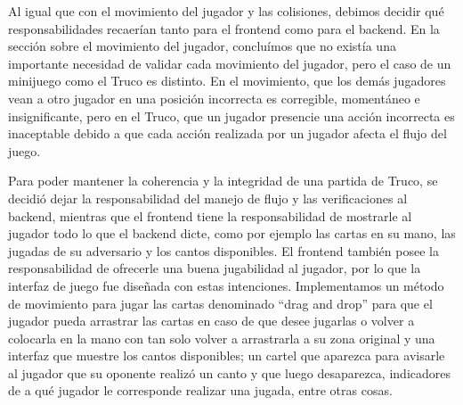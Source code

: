 Al igual que con el movimiento del jugador y las colisiones, debimos decidir qué 
responsabilidades recaerían tanto para el frontend como para el backend. En la sección 
sobre el movimiento del jugador, concluímos que no existía una importante necesidad de 
validar cada movimiento del jugador, pero el caso de un minijuego como el Truco es distinto. 
En el movimiento, que los demás jugadores vean a otro jugador en una posición incorrecta es 
corregible, momentáneo e insignificante, pero en el Truco, que un jugador presencie una acción 
incorrecta es inaceptable debido a que cada acción realizada por un jugador afecta el flujo del juego.

Para poder mantener la coherencia y la integridad de una partida de Truco, se decidió dejar 
la responsabilidad del manejo de flujo y las verificaciones al backend, mientras que el 
frontend tiene la responsabilidad de mostrarle al jugador todo lo que el backend dicte, 
como por ejemplo las cartas en su mano, las jugadas de su adversario y los cantos disponibles. 
El frontend también posee la responsabilidad de ofrecerle una buena jugabilidad al jugador, 
por lo que la interfaz de juego fue diseñada con estas intenciones. Implementamos un método 
de movimiento para jugar las cartas denominado “drag and drop” para que el jugador pueda 
arrastrar las cartas en caso de que desee jugarlas o volver a colocarla en la mano con tan 
solo volver a arrastrarla a su zona original y una interfaz que muestre los cantos disponibles; 
un cartel que aparezca para avisarle al jugador que su oponente realizó un canto y que luego 
desaparezca, indicadores de a qué jugador le corresponde realizar una jugada, entre otras cosas.

